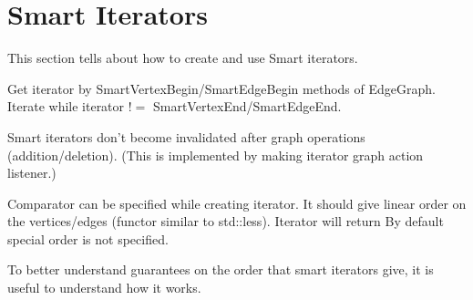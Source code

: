 \section{Smart Iterators}

This section tells about how to create and use Smart iterators. 

Get iterator by SmartVertexBegin/SmartEdgeBegin methods of EdgeGraph.
Iterate while iterator $!=$ SmartVertexEnd/SmartEdgeEnd.

Smart iterators don't become invalidated after graph operations (addition/deletion). (This is implemented by making iterator graph action listener.)

Comparator can be specified while creating iterator. It should give linear order on the vertices/edges (functor similar to std::less). Iterator will return By default special order is not specified.

To better understand guarantees on the order that smart iterators give, it is useful to understand how it works. 



